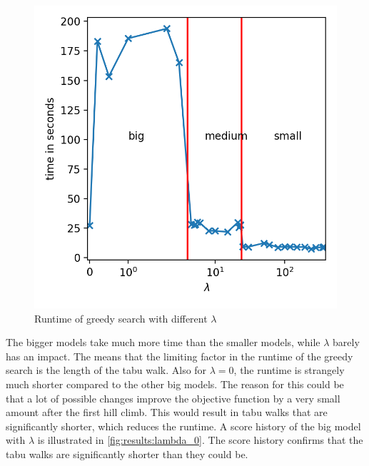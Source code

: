 \documentclass[sigconf, fleqn, prologue, dvipsnames]{acmart}
\begin{document}
\begin{figure}
	\centering
	\includegraphics[scale=0.5]{graphics/times.png}
	\caption{Runtime of greedy search with different $\lambda$}
	\label{fig:results:runtime}
\end{figure}

The bigger models take much more time than the smaller models, while $\lambda$ barely has an impact.
The means that the limiting factor in the runtime of the greedy search is the length of the tabu walk.
Also for $\lambda = 0$, the runtime is strangely much shorter compared to the other big models.
The reason for this could be that a lot of possible changes improve the objective function by a very small amount after the first hill climb.
This would result in tabu walks that are significantly shorter, which reduces the runtime.
A score history of the big model with $\lambda$ is illustrated in \autoref{fig:results:lambda_0}.
The score history confirms that the tabu walks are significantly shorter than they could be.
\end{document}
